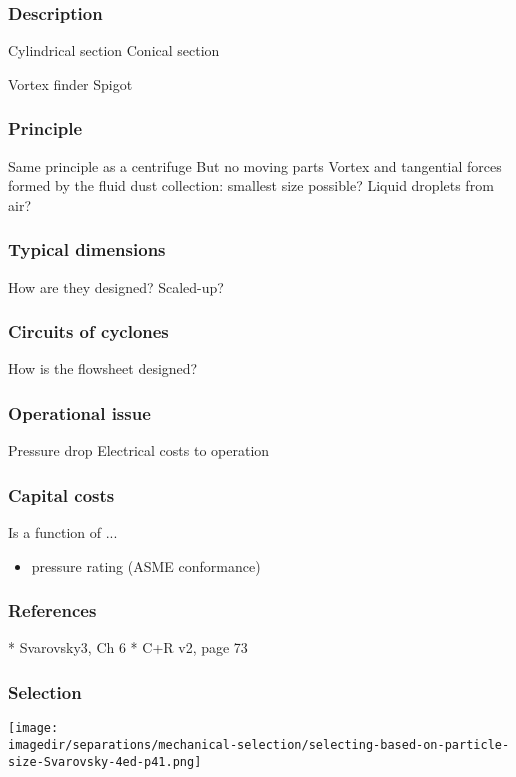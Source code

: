 \begin{frame}\frametitle{Description}
	Cylindrical section
	Conical section
	
	Vortex finder
	Spigot
\end{frame}

\begin{frame}\frametitle{Principle}
	Same principle as a centrifuge
	But no moving parts
	Vortex and tangential forces formed by the fluid
	dust collection: smallest size possible?
	Liquid droplets from air?	
\end{frame}

\begin{frame}\frametitle{Typical dimensions}
	How are they designed?
	Scaled-up?	
\end{frame}

\begin{frame}\frametitle{Circuits of cyclones}
	How is the flowsheet designed?
	
\end{frame}

\begin{frame}\frametitle{Operational issue}
	Pressure drop
	Electrical costs to operation
\end{frame}

\begin{frame}\frametitle{Capital costs}
	Is a function of ...
	\begin{itemize}
		\item	pressure rating (ASME conformance)
	\end{itemize}
\end{frame}

\begin{frame}\frametitle{References}
	* Svarovsky3, Ch 6
	* C+R v2, page 73
\end{frame}

\begin{frame}\frametitle{Selection}
	\begin{center}
		\texttt{[image: \\imagedir/separations/mechanical-selection/selecting-based-on-particle-size-Svarovsky-4ed-p41.png]}
	\end{center}
\end{frame}
